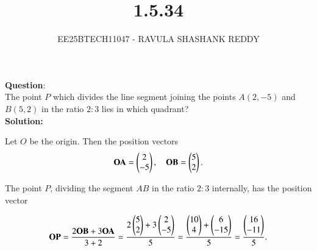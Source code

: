 \documentclass[journal]{article}
\begin{document}
	
	
	\vspace{3cm}
	
\title{1.5.34}
\author{EE25BTECH11047 - RAVULA SHASHANK REDDY}
\maketitle

\renewcommand{\thefigure}{\theenumi}
\renewcommand{\thetable}{\theenumi}
\setlength{\intextsep}{10pt}

\renewcommand{\thetable}{\theenumi}

\textbf{Question}:\\

The point \(P\) which divides the line segment joining the points \(A(2,-5)\) and \(B(5,2)\) in the ratio \(2:3\) lies in which quadrant?\\

\textbf{Solution:}

Let \(O\) be the origin. Then the position vectors 
\begin{align*}
\mathbf{OA} = \begin{pmatrix}2 \\ -5\end{pmatrix}, \quad \mathbf{OB} = \begin{pmatrix}5 \\ 2\end{pmatrix}.
\end{align*}

The point \(P\), dividing the segment \(AB\) in the ratio \(2:3\) internally, has the position vector

\[
\mathbf{OP} = \frac{2 \mathbf{OB} + 3\mathbf{OA}}{3 + 2} = \frac{2 \begin{pmatrix}5 \\ 2\end{pmatrix} + 3\begin{pmatrix}2 \\ -5\end{pmatrix}}{5} = \frac{\begin{pmatrix}10 \\ 4\end{pmatrix} + \begin{pmatrix}6 \\ -15\end{pmatrix}}{5} = \frac{\begin{pmatrix}16 \\ -11\end{pmatrix}}{5}.
\]
\end{document}
